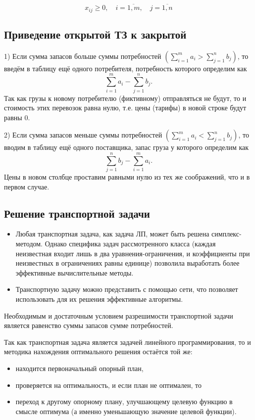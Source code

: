 \documentclass[17pt]{extarticle}
\begin{document}
\[
    x_{ij} \geq 0, \quad i = \overline{1, m}, \quad j = \overline{1, n}
\]

\subsection{Приведение открытой ТЗ к закрытой}
1) Если сумма запасов больше суммы потребностей \( \left( \sum_{i=1}^m a_i > \sum_{j=1}^n b_j \right) \), то введём в таблицу ещё одного потребителя, потребность которого определим как
\[
    \sum_{i=1}^m a_i - \sum_{j=1}^n b_j.
\]
Так как грузы к новому потребителю (фиктивному) отправляться не будут, то и стоимость этих перевозок равна нулю, т.е. цены (тарифы) в новой строке будут равны 0.

2) Если сумма запасов меньше суммы потребностей \( \left( \sum_{i=1}^m a_i < \sum_{j=1}^n b_j \right) \), то вводим в таблицу ещё одного поставщика, запас груза у которого определим как
\[
    \sum_{j=1}^n b_j - \sum_{i=1}^m a_i.
\]
Цены в новом столбце проставим равными нулю из тех же соображений, что и в первом случае.

\subsection{Решение транспортной задачи}
\begin{itemize}
    \item Любая транспортная задача, как задача ЛП, может быть решена симплекс-методом. Однако специфика задач рассмотренного класса (каждая неизвестная входит лишь в два уравнения-ограничения, и коэффициенты при неизвестных в ограничениях равны единице) позволила выработать более эффективные вычислительные методы.
    \item Транспортную задачу можно представить с помощью сети, что позволяет использовать для их решения эффективные алгоритмы.
\end{itemize}

\begin{theorem}
    Необходимым и достаточным условием разрешимости транспортной задачи является равенство суммы запасов сумме потребностей.
\end{theorem}

Так как транспортная задача является задачей линейного программирования, то и методика нахождения оптимального решения остаётся той же:
\begin{itemize}
    \item находится первоначальный опорный план,
    \item проверяется на оптимальность, и если план не оптимален, то
    \item переход к другому опорному плану, улучшающему целевую функцию в смысле оптимума (а именно уменьшающую значение целевой функции).
\end{itemize}
\end{document}
